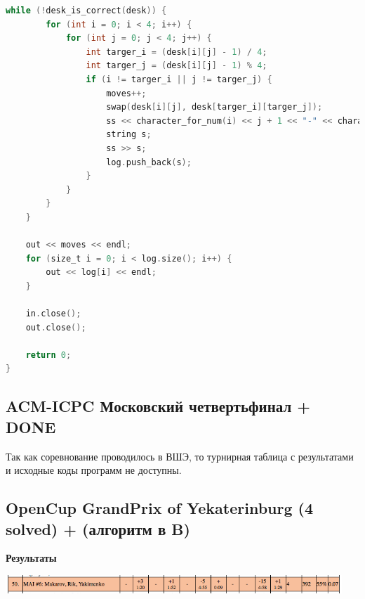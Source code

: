 \documentclass[a4paper,12pt]{article}
\begin{document}
\begin{lstlisting}[language=C]
    while (!desk_is_correct(desk)) {
        for (int i = 0; i < 4; i++) {
            for (int j = 0; j < 4; j++) {
                int targer_i = (desk[i][j] - 1) / 4;
                int targer_j = (desk[i][j] - 1) % 4;
                if (i != targer_i || j != targer_j) {
                    moves++;
                    swap(desk[i][j], desk[targer_i][targer_j]);
                    ss << character_for_num(i) << j + 1 << "-" << character_for_num(targer_i) << targer_j + 1 << endl;
                    string s;
                    ss >> s;
                    log.push_back(s);
                }
            }
        }
    }
    
    out << moves << endl;
    for (size_t i = 0; i < log.size(); i++) {
        out << log[i] << endl;
    }
    
    in.close();
    out.close();
    
    return 0;
}

\end{lstlisting}





%
%
\newpage
\subsection{ACM-ICPC Московский четвертьфинал + DONE}

Так как соревнование проводилось в ВШЭ, то турнирная таблица с результатами и исходные коды программ не доступны. \\




%
%
\newpage
\subsection{OpenCup GrandPrix of Yekaterinburg (4 solved) + (алгоритм в B)}

\textbf{{\large Результаты}} \\
\begin{center}
\includegraphics[width=0.95\textwidth]{OC_YKB/result.png}\\ [1cm]
\end{center}
\end{document}
